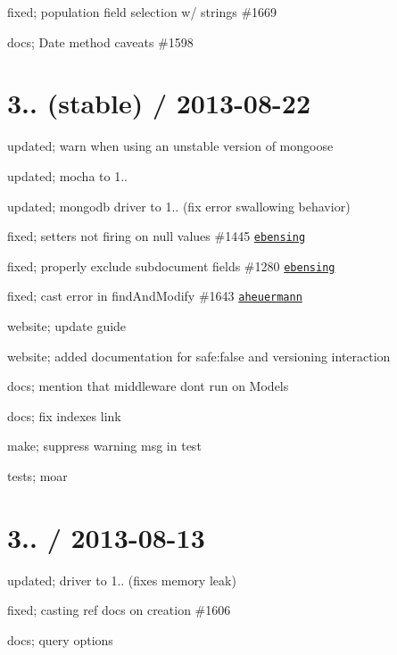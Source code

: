 \begin{DoxyItemize}
\item fixed; population field selection w/ strings \#1669
\item docs; Date method caveats \#1598
\end{DoxyItemize}

\section*{3.. (stable) / 2013-\/08-\/22 }


\begin{DoxyItemize}
\item updated; warn when using an unstable version of mongoose
\item updated; mocha to 1..
\item updated; mongodb driver to 1.. (fix error swallowing behavior)
\item fixed; setters not firing on null values \#1445 \href{https://github.com/ebensing}{\tt ebensing}
\item fixed; properly exclude subdocument fields \#1280 \href{https://github.com/ebensing}{\tt ebensing}
\item fixed; cast error in find\+And\+Modify \#1643 \href{https://github.com/aheuermann}{\tt aheuermann}
\item website; update guide
\item website; added documentation for safe\+:false and versioning interaction
\item docs; mention that middleware dont run on Models
\item docs; fix indexes link
\item make; suppress warning msg in test
\item tests; moar
\end{DoxyItemize}

\section*{3.. / 2013-\/08-\/13 }


\begin{DoxyItemize}
\item updated; driver to 1.. (fixes memory leak)
\item fixed; casting ref docs on creation \#1606
\item docs; query options
\end{DoxyItemize}

